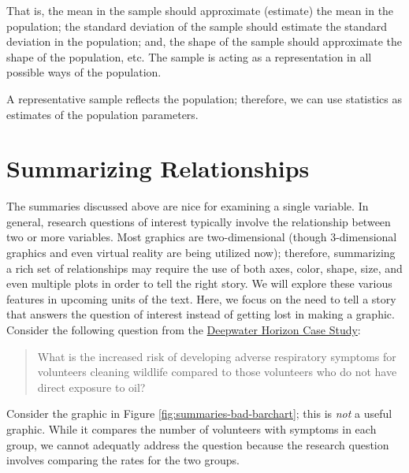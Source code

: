 \documentclass[]{book}
\theoremstyle{definition}
\theoremstyle{definition}
\theoremstyle{remark}
\let\BeginKnitrBlock\begin \let\EndKnitrBlock\end
\begin{document}
That is, the mean in the sample should approximate (estimate) the mean
in the population; the standard deviation of the sample should estimate
the standard deviation in the population; and, the shape of the sample
should approximate the shape of the population, etc. The sample is
acting as a representation in all possible ways of the population.

\BeginKnitrBlock{rmdkeyidea}
A representative sample reflects the population; therefore, we can use
statistics as estimates of the population parameters.
\EndKnitrBlock{rmdkeyidea}

\section{Summarizing Relationships}\label{summarizing-relationships}

The summaries discussed above are nice for examining a single variable.
In general, research questions of interest typically involve the
relationship between two or more variables. Most graphics are
two-dimensional (though 3-dimensional graphics and even virtual reality
are being utilized now); therefore, summarizing a rich set of
relationships may require the use of both axes, color, shape, size, and
even multiple plots in order to tell the right story. We will explore
these various features in upcoming units of the text. Here, we focus on
the need to tell a story that answers the question of interest instead
of getting lost in making a graphic. Consider the following question
from the \protect\hyperlink{CaseDeepwater}{Deepwater Horizon Case
Study}:

\begin{quote}
What is the increased risk of developing adverse respiratory symptoms
for volunteers cleaning wildlife compared to those volunteers who do not
have direct exposure to oil?
\end{quote}

Consider the graphic in Figure \ref{fig:summaries-bad-barchart}; this is
\emph{not} a useful graphic. While it compares the number of volunteers
with symptoms in each group, we cannot adequatly address the question
because the research question involves comparing the rates for the two
groups.
\end{document}
